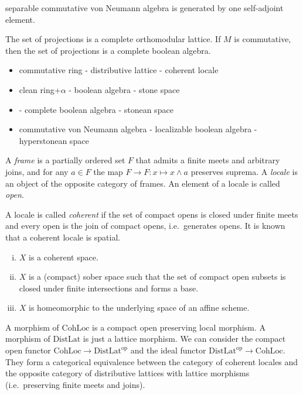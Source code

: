 \documentclass{../../large}
\begin{document}
separable commutative von Neumann algebra is generated by one self-adjoint element.





\begin{prb}
The set of projections is a complete orthomodular lattice.
If $M$ is commutative, then the set of projections is a complete boolean algebra.
\end{prb}

\begin{itemize}
\item commutative ring - distributive lattice - coherent locale
\item clean ring+$\alpha$ - boolean algebra - stone space
\item - complete boolean algebra - stonean space
\item commutative von Neumann algebra - localizable boolean algebra - hyperstonean space
\end{itemize}


A \emph{frame} is a partially ordered set $F$ that admits a finite meets and arbitrary joins, and for any $a\in F$ the map $F\to F:x\mapsto x\wedge a$ preserves suprema.
A \emph{locale} is an object of the opposite category of frames.
An element of a locale is called \emph{open}.


A locale is called \emph{coherent} if the set of compact opens is closed under finite meets and every open is the join of compact opens, i.e.~generates opens.
It is known that a coherent locale is spatial.
\begin{enumerate}[(i)]
\item $X$ is a coherent space.
\item $X$ is a (compact) sober space such that the set of compact open subsets is closed under finite intersections and forms a base.
\item $X$ is homeomorphic to the underlying space of an affine scheme.
\end{enumerate}
A morphism of $\mathrm{CohLoc}$ is a compact open preserving local morphism.
A morphism of $\mathrm{DistLat}$ is just a lattice morphism.
We can consider the compact open functor $\mathrm{CohLoc}\to\mathrm{DistLat}^{\mathrm{op}}$ and the ideal functor $\mathrm{DistLat}^{\mathrm{op}}\to\mathrm{CohLoc}$.
They form a categorical equivalence between the category of coherent locales and the opposite category of distributive lattices with lattice morphisms (i.e.~preserving finite meets and joins).
\end{document}
